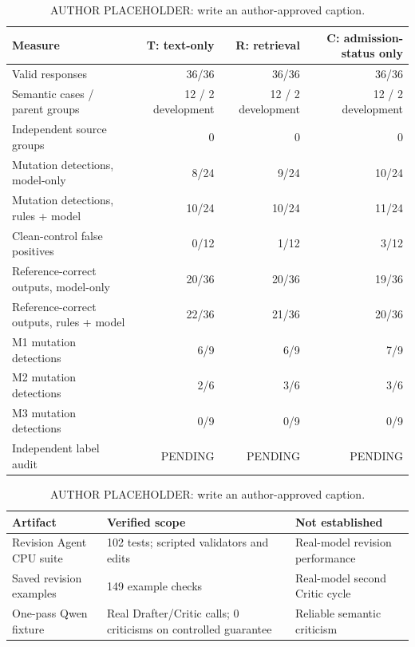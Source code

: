 \begin{table}[t]
\centering
\small
\caption{AUTHOR PLACEHOLDER: write an author-approved caption.}
\label{tab:rq3-conditions}
\begin{tabular}{lrrr}
\toprule
Measure & T: text-only & R: retrieval & C: admission-status only \\
\midrule
Valid responses & 36/36 & 36/36 & 36/36 \\
Semantic cases / parent groups & 12 / 2 development & 12 / 2 development & 12 / 2 development \\
Independent source groups & 0 & 0 & 0 \\
Mutation detections, model-only & 8/24 & 9/24 & 10/24 \\
Mutation detections, rules + model & 10/24 & 10/24 & 11/24 \\
Clean-control false positives & 0/12 & 1/12 & 3/12 \\
Reference-correct outputs, model-only & 20/36 & 20/36 & 19/36 \\
Reference-correct outputs, rules + model & 22/36 & 21/36 & 20/36 \\
M1 mutation detections & 6/9 & 6/9 & 7/9 \\
M2 mutation detections & 2/6 & 3/6 & 3/6 \\
M3 mutation detections & 0/9 & 0/9 & 0/9 \\
Independent label audit & PENDING & PENDING & PENDING \\
\bottomrule
\end{tabular}
\end{table}

\begin{table}[t]
\centering
\small
\caption{AUTHOR PLACEHOLDER: write an author-approved caption.}
\label{tab:rq4}
\begin{tabular}{lll}
\toprule
Artifact & Verified scope & Not established \\
\midrule
Revision Agent CPU suite & 102 tests; scripted validators and edits & Real-model revision performance \\
Saved revision examples & 149 example checks & Real-model second Critic cycle \\
One-pass Qwen fixture & Real Drafter/Critic calls; 0 criticisms on controlled guarantee & Reliable semantic criticism \\
\bottomrule
\end{tabular}
\end{table}
